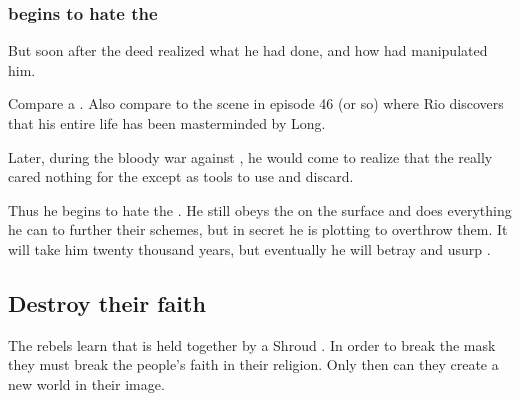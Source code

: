 \subsubsection{\Azraid{} begins to hate the \banes}
But soon after the deed \Azraid{} realized what he had done, and how \Daggerrain{} had manipulated him. 

Compare a . 
Also compare to the scene in \emph{\JuukenSentaiGekiranger} episode 46 (or so) where Rio discovers that his entire life has been masterminded by Long. 

Later, during the bloody war against \Merkyrah{}, he would come to realize that the \banes{} really cared nothing for the \resphain{} except as tools to use and discard. 

Thus he begins to hate the \banes. 
He still obeys the \banelords{} on the surface and does everything he can to further their schemes, but in secret he is plotting to overthrow them. 
It will take him twenty thousand years, but eventually he will betray and usurp \Banelord{} \Daggerrain. 









\subsection{Destroy their faith}
The rebels learn that \Merkyrah{} is held together by a Shroud . 
In order to break the mask they must break the \Merkyran{} people's faith in their religion. 
Only then can they create a new world in their image. 


